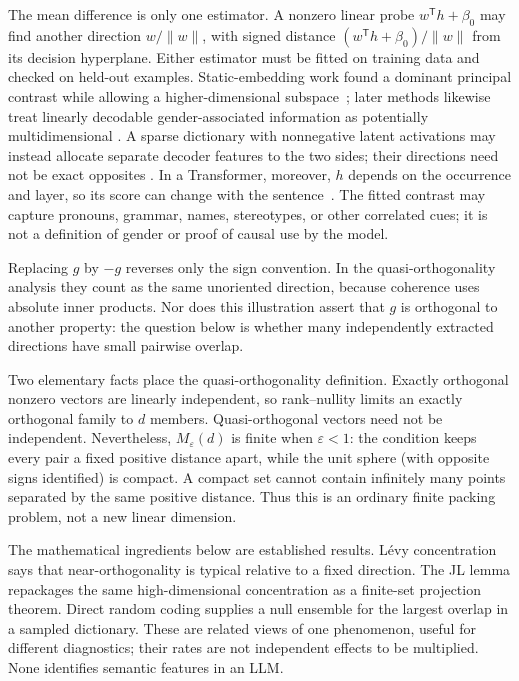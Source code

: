 \documentclass[
  aps,
  reprint,
  superscriptaddress,
  floatfix,
  nofootinbib,
  longbibliography
]{revtex4-2}
\newcommand{\T}{^{\mathsf{T}}}
\newcommand{\norm}[1]{\lVert #1 \rVert}
\begin{document}
The mean difference is only one estimator.  A nonzero linear probe
$w\T h+\beta_0$ may find another direction $w/\norm w$, with signed distance
$(w\T h+\beta_0)/\norm w$ from its decision hyperplane.  Either estimator must
be fitted on training data and checked on held-out examples.  Static-embedding
work found a dominant principal contrast while allowing a higher-dimensional
subspace~\cite{bolukbasi2016gender}; later methods likewise treat linearly
decodable gender-associated information as potentially multidimensional
\cite{ravfogel2022leace}.  A sparse dictionary with nonnegative latent
activations may instead allocate separate decoder features to the two sides;
their directions need not be exact opposites
\cite{bricken2023monosemanticity,li2025geometry}.  In a Transformer, moreover,
$h$ depends on the occurrence and layer, so its score can change with the
sentence~\cite{zhao2019contextualgender,ethayarajh2019}.  The fitted contrast
may capture pronouns, grammar, names, stereotypes, or other correlated cues;
it is not a definition of gender or proof of causal use by the model.

Replacing $g$ by $-g$ reverses only the sign convention.  In the
quasi-orthogonality analysis they count as the same unoriented direction,
because coherence uses absolute inner products.  Nor does this illustration
assert that $g$ is orthogonal to another property: the question below is
whether many independently extracted directions have small pairwise overlap.

Two elementary facts place the quasi-orthogonality definition.  Exactly
orthogonal nonzero vectors are linearly independent, so rank--nullity limits an exactly
orthogonal family to $d$ members.  Quasi-orthogonal vectors need not be
independent.  Nevertheless, $M_\varepsilon(d)$ is finite when
$\varepsilon<1$: the condition keeps every pair a fixed positive distance
apart, while the unit sphere (with opposite signs identified) is compact.  A
compact set cannot contain infinitely many points separated by the same
positive distance.  Thus this is an ordinary finite packing problem, not a new
linear dimension.

The mathematical ingredients below are established results.  L\'evy
concentration says that near-orthogonality is typical relative to a fixed
direction.  The JL lemma repackages the same high-dimensional concentration as
a finite-set projection theorem.  Direct random coding supplies a null
ensemble for the largest overlap in a sampled dictionary.  These are related
views of one phenomenon, useful for different diagnostics; their rates are not
independent effects to be multiplied.  None identifies semantic features in
an LLM.
\end{document}
